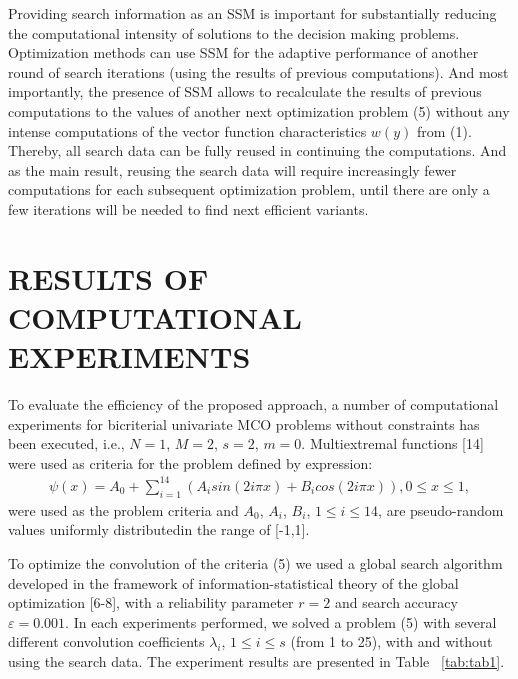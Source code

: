 \documentclass{aip-cp}
\begin{document}
Providing search information as an SSM is important for substantially reducing the computational intensity of solutions to the decision making problems. Optimization methods can use SSM for the adaptive performance of another round of search iterations (using the results of previous computations). And most importantly, the presence of SSM allows to recalculate the results of previous computations to the values of another next optimization problem (5) without any intense computations of the vector function characteristics $w(y)$ from (1). Thereby, all search data can be fully reused in continuing the computations. And as the main result, reusing the search data will require increasingly fewer computations for each subsequent optimization problem, until there are only a few iterations will be needed to find next efficient variants.

\section{RESULTS OF COMPUTATIONAL EXPERIMENTS}
To evaluate the efficiency of the proposed approach, a number of computational experiments for bicriterial univariate MCO problems without constraints has been executed, i.e., $N=1$, $M=2$, $s=2$, $m=0$. Multiextremal functions [14] were used as criteria for the problem defined by expression:
\begin{eqnarray*}
\psi(x) = A_0 + \sum\limits_{i=1}^{14} (A_i sin (2 i \pi x) + B_i cos (2 i \pi x)) , 0 \leq x \leq 1,
\end{eqnarray*}
were used as the problem criteria and $A_0$, $A_i$, $B_i$, $1 \leq i \leq 14$, are pseudo-random values uniformly distributedin the range of [-1,1]. \par

To optimize the convolution of the criteria (5) we used a global search algorithm developed in the framework of information-statistical theory of the global optimization [6-8], with a reliability parameter $r=2$ and search accuracy $\varepsilon=0.001$. In each experiments performed, we solved a problem (5) with several different convolution coefficients $\lambda_i$, $1 \leq i \leq s$ (from 1 to 25), with and without using the search data. The experiment results are presented in Table ~\ref{tab:tab1}.
\end{document}

